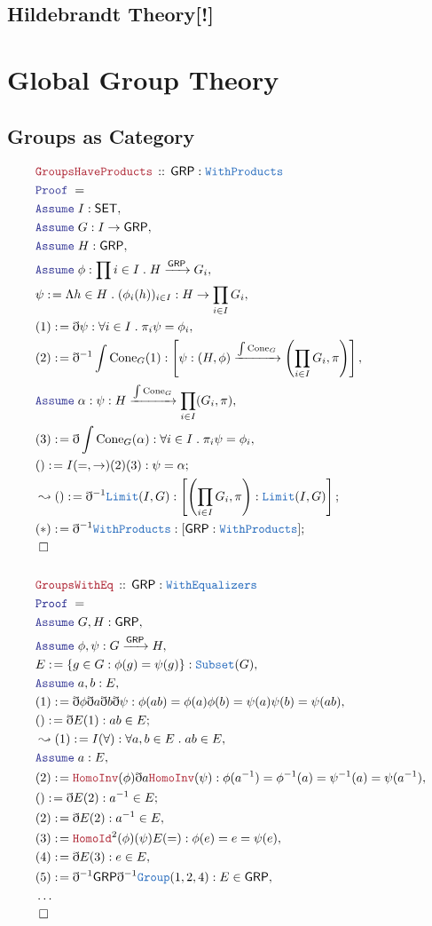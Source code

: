\documentclass[12pt]{scrartcl}
\newcommand{\TYPE}[1]{\textcolor{NavyBlue}{\mathtt{#1}}}
\newcommand{\LOGIC}[1]{\textcolor{Blue}{\mathtt{#1}}}
\newcommand{\THM}[1]{\textcolor{Maroon}{\mathtt{#1}}}
\renewcommand{\.}{\; . \;}
\newcommand{\de}{: \kern 0.1pc =}
\newcommand{\Theorem}[2]{& \THM{#1} \, :: \, #2 \\ & \Proof = \\ }
\newcommand{\Page}[1]{ \begin{align*} #1 \end{align*}   }
\newcommand{ \bd }{ \ByDef }
\newcommand{\NoProof}{ & \ldots \\ \EndProof}
\newcommand{\Say}[3]{& #1 \de #2 : #3, \\}
\newcommand{\Conclude}[3]{& #1 \de #2 : #3; \\}
\newcommand{\Derive}[3]{& \leadsto #1 \de #2 : #3, \\}
\newcommand{\DeriveConclude}[3]{& \leadsto #1 \de #2 : #3 ; \\}
\newcommand{\Assume}[2]{& \LOGIC{Assume} \; #1 : #2, \\}
\newcommand{\QED}{\; \square}
\newcommand{\EndProof}{& \QED \\}
\newcommand{\ByDef}{\eth}
\newcommand{\Proof}{\LOGIC{Proof} \; }
\newcommand{\Arrow}[1]{\xrightarrow{#1}}
\newcommand{\SET}{\mathsf{SET}}
\newcommand{\GRP}{\mathsf{GRP}}
\begin{document}
\subsection{Hildebrandt Theory[!]}
\section{Global Group Theory}
\subsection{Groups as Category}
\Page{
	\Theorem{GroupsHaveProducts}{ \GRP : \TYPE{WithProducts} }
	\Assume{I}{\SET}
	\Assume{G}{I \to \GRP}
	\Assume{H}{\GRP}
	\Assume{\phi}{\prod i \in I \. H \Arrow{\GRP} G_i}
	\Say{\psi}{\Lambda h \in H \. (\phi_i(h))_{i \in I}}{  H \to   \prod_{i \in I} G_i  }
	\Say{(1)}{\bd \psi}{\forall i \in I \. \pi_i \psi = \phi_i}
	\Say{(2)}{\bd^{-1} \int \mathrm{Cone}_G(1)}
	{\left[\psi : (H,\phi) \Arrow{\int \mathrm{Cone}_G} \left( \prod_{i \in I} G_i,\pi \right) \right]   }
	\Assume{\alpha}{\psi : H \Arrow{\int \mathrm{Cone}_G} \prod_{i \in I} (G_i, \pi) }
	\Say{(3)}{\bd \int \mathrm{Cone}_G (\alpha) }{ \forall i \in I \. \pi_i \psi = \phi_i }
	\Conclude{()}{ I(=,\to)(2)(3)}{  \psi = \alpha  }
	\DeriveConclude{ ()  }{\bd^{-1} \TYPE{Limit}(I,G) }
	{ \left[ \left(\prod_{i \in I} G_i , \pi   \right)  : \TYPE{Limit}(I,G) \right]   }
	\Conclude{(*)}{\bd^{-1} \TYPE{WithProducts} }{  [\GRP : \TYPE{WithProducts}] }
	\EndProof
	\\
	\Theorem{GroupsWithEq}{\GRP : \TYPE{WithEqualizers}}
	\Assume{G,H}{\GRP}
	\Assume{\phi,\psi}{G \Arrow{\GRP} H}
	\Say{E}{\{ g \in G : \phi(g) = \psi(g)  \}}{\TYPE{Subset}(G)}
	\Assume{a,b}{E}
	\Say{(1)}{\bd\phi \bd a \bd b \bd \psi}{  \phi(ab) = \phi(a)\phi(b) = \psi(a)\psi(b) = \psi(ab)    }
	\Conclude{()}{\bd E (1)}{ab \in E}
	\Derive{(1)}{ I(\forall)  }{ \forall a,b \in E \. ab \in E   }
	\Assume{a}{ E  }
	\Say{(2)}{\THM{HomoInv}(\phi)\bd a \THM{HomoInv}(\psi)}{  \phi(a^{-1}) = \phi^{-1}(a) = \psi^{-1}(a) = \psi(a^{-1}) }
	\Conclude{()}{\bd E (2)   }{ a^{-1} \in E    }
	\Say{(2)}{\bd E (2)  }{  a^{-1} \in E    }
	\Say{(3)}{ \THM{HomoId}^2(\phi)(\psi)E(=)  }{  \phi(e) = e = \psi(e) }
	\Say{(4)}{\bd E (3)}{ e \in E}
	\Say{(5)}{\bd^{-1} \GRP\bd^{-1} \TYPE{Group}(1,2,4)}{E \in \GRP}
	\NoProof
}	
\newpage
\end{document}
